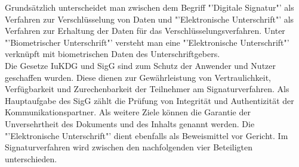 Grundsätzlich unterscheidet man zwischen dem Begriff "'Digitale Signatur"' als Verfahren zur Verschlüsselung von Daten und "'Elektronische Unterschrift"' als Verfahren zur Erhaltung der Daten für das Verschlüsselungsverfahren. Unter "'Biometrischer Unterschrift"' versteht man eine "'Elektronische Unterschrift"' verknüpft mit biometrischen Daten des Unterschriftgebers.\\
Die Gesetze IuKDG und SigG sind zum Schutz der Anwender und Nutzer geschaffen wurden. Diese dienen zur Gewährleistung von Vertraulichkeit, Verfügbarkeit und Zurechenbarkeit der Teilnehmer am Signaturverfahren. \cite{standdeswissens1} Als Hauptaufgabe des SigG zählt die Prüfung von Integrität und Authentizität der Kommunikationspartner. Als weitere Ziele können die Garantie der Unversehrtheit des Dokuments und des Inhalts genannt werden. Die "'Elektronische Unterschrift"' dient ebenfalls als Beweismittel vor Gericht. Im Signaturverfahren wird zwischen den nachfolgenden vier Beteiligten unterschieden. \cite{standdeswissens2}